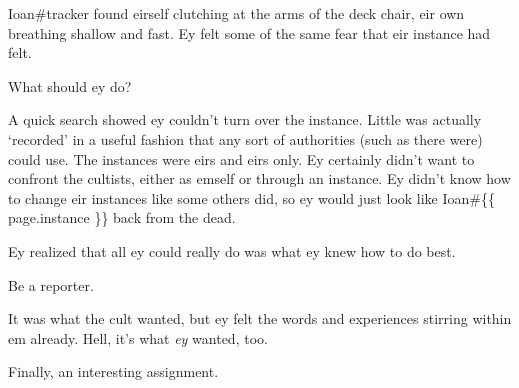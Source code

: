 Ioan\#tracker found eirself clutching at the arms of the deck chair, eir own breathing shallow and fast. Ey felt some of the same fear that eir instance had felt.

What should ey do?

A quick search showed ey couldn't turn over the instance. Little was actually `recorded' in a useful fashion that any sort of authorities (such as there were) could use. The instances were eirs and eirs only. Ey certainly didn't want to confront the cultists, either as emself or through an instance. Ey didn't know how to change eir instances like some others did, so ey would just look like Ioan\#\{\{ page.instance \}\} back from the dead.

Ey realized that all ey could really do was what ey knew how to do best.

Be a reporter.

It was what the cult wanted, but ey felt the words and experiences stirring within em already. Hell, it's what \emph{ey} wanted, too.

Finally, an interesting assignment.
